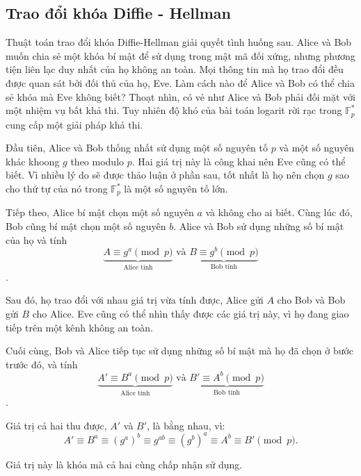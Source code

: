 \subsection{Trao đổi khóa Diffie - Hellman}
\label{sec:diffie-hellman}
Thuật toán trao đổi khóa Diffie-Hellman giải quyết tình huống sau. Alice và
Bob muốn chia sẻ một khóa bí mật để sử dụng trong mật mã đối xứng, nhưng
phương tiện liên lạc duy nhất của họ không an toàn. Mọi thông tin mà họ trao
đổi đều được quan sát bởi đối thủ của họ, Eve. Làm cách nào để Alice và Bob có
thể chia sẻ khóa mà Eve không biết? Thoạt nhìn, có vẻ như Alice và Bob phải
đối mặt với một nhiệm vụ bất khả thi. Tuy nhiên độ khó của bài toán logarit rời
rạc trong $\mathbb{F}^*_p$ cung cấp một giải pháp khả thi.

Đầu tiên, Alice và Bob thống nhất sử dụng một số nguyên tố $p$ và một số nguyên khác khoong $g$ theo modulo $p$. Hai giá trị này là công khai nên Eve cũng có thể biết.
Vì nhiều lý do sẽ được thảo luận ở phần sau, tốt nhất là họ nên chọn $g$ sao cho thứ tự của nó trong $\mathbb{F}^*_p$ là một số nguyên tố lớn.

Tiếp theo, Alice bí mật chọn một số nguyên $a$ và không cho ai biết. Cùng lúc đó, Bob cũng bí mật chọn một số nguyên $b$.
Alice và Bob sử dụng những số bí mật của họ và tính
$$\underbrace{A \equiv g^a \pmod{p}}_{\text{Alice tính}} \text{ và } \underbrace{B \equiv g^b \pmod{p}}_{\text{Bob tính}}$$.

Sau đó, họ trao đổi với nhau giá trị vừa tính được, Alice gửi $A$ cho Bob và Bob gửi $B$ cho Alice. Eve cũng có thể nhìn thấy được các giá trị này, vì họ đang giao tiếp trên một kênh không an toàn.

Cuối cùng, Bob và Alice tiếp tục sử dụng những số bí mật mà họ đã chọn ở bước trước đó, và tính
$$\underbrace{A' \equiv B^a \pmod{p}}_{\text{Alice tính}} \text{ và } \underbrace{B' \equiv A^b \pmod{p}}_{\text{Bob tính}}$$.

Giá trị cả hai thu được, $A'$ và $B'$, là bằng nhau, vì:
$$A' \equiv B^a \equiv (g^a)^b \equiv g^{ab} \equiv (g^b)^a \equiv A^b \equiv B' \pmod{p}.$$

Giá trị này là khóa mà cả hai cùng chấp nhận sử dụng.

